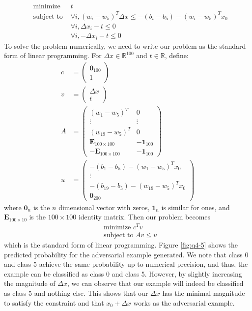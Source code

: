 \documentclass[
	12pt, %
]{../Template/fphw}
\begin{document}
\begin{enumerate}[label = (\arabic*)]
    \begin{align}
        &\textrm{minimize } &t \\
        &\textrm{subject to } &\forall i, (w_i-w_5)^T \Delta x \leq -(b_i-b_5) - (w_i-w_5)^Tx_0  \\
        & & \forall i, \Delta x_i -t \leq 0\\
        & & \forall i, -\Delta x_i -t \leq 0
    \end{align}
    To solve the problem numerically, we need to write our problem as the standard form of linear programming. For $\Delta x\in \mathbb{R}^{100}$ and $t\in \mathbb{R}$, define:
    \begin{align}
        c &= \begin{pmatrix}\textbf{0}_{100} \\ 1\end{pmatrix}\\
        v &= \begin{pmatrix} \Delta x \\ t \end{pmatrix} \\
        A &= \begin{pmatrix}
            (w_1-w_5)^T & 0 \\
            \vdots & \vdots \\
            (w_{19}-w_5)^T & 0 \\
            \textbf{E}_{100\times 100} & -\textbf{1}_{100} \\
            -\textbf{E}_{100\times 100} & -\textbf{1}_{100}
        \end{pmatrix} \\
        u &= \begin{pmatrix}-(b_1-b_5) - (w_1-w_5)^T x_0 \\ \vdots \\ -(b_{19}-b_5) - (w_{19}-w_5)^T x_0 \\ \textbf{0}_{200}\end{pmatrix}
    \end{align}
    where $\textbf{0}_{n}$ is the $n$ dimensional vector with zeros, $\textbf{1}_n$ is similar for ones, and $\textbf{E}_{100\times 10}$ is the $100\times 100$ identity matrix. Then our problem becomes
    \begin{align}
        &\textrm{minimize } c^T v \\
        &\textrm{subject to }  Av \leq u
    \end{align}
    which is the standard form of linear programming. Figure \ref{fig:q4-5} shows the predicted probability for the adversarial example generated. We note that class 0 and class 5 achieve the same probability up to numerical precision, and thus, the example can be classified as class 0 and class 5. However, by slightly increasing the magnitude of $\Delta x$, we can observe that our example will indeed be classified as class 5 and nothing else. This shows that our $\Delta x$ has the minimal magnitude to satisfy the constraint and that $x_0+\Delta x$ works as the adversarial example.

\end{enumerate}
\end{document}
